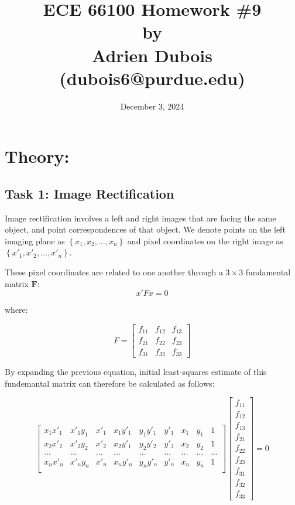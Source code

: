 \documentclass{article}
\author{}
\date{December 3, 2024}
\title{\Large \textbf{ECE 66100 Homework \#9\\[0.1in] by\\ [0.1in] Adrien Dubois (dubois6@purdue.edu)}}
\begin{document}
\maketitle
\tableofcontents

\section{Theory:}
\subsection{Task 1: Image Rectification}
Image rectification involves a left and right images that are facing the same object, and point correspondences 
of that object. We denote points on the left imaging plane as $\left\{x_1, x_2, ..., x_n\right\}$ and pixel
coordinates on the right image as $\left\{x'_1, x'_2, ..., x'_n\right\}$. 

These pixel coordinates are related to one another through a $3\times3$ fundamental matrix $\boldsymbol{F}$:
\[x' F x = 0\]

where:

\[F = 
    \begin{bmatrix}
        f_{11} & f_{12} & f_{13} \\
        f_{21} & f_{22} & f_{23} \\
        f_{31} & f_{32} & f_{33}
    \end{bmatrix}
\]

By expanding the previous equation, initial least-squares estimate of this fundemantal matrix can 
therefore be calculated as follows:

\[
    \begin{bmatrix}
        x_1 x'_1 & x'_1 y_1 & x'_1 & x_1 y'_1 & y_1 y'_1 & y'_1 & x_1 & y_1 & 1 \\
        x_2 x'_2 & x'_2 y_2 & x'_2 & x_2 y'_1 & y_2 y'_2 & y'_2 & x_2 & y_2 & 1 \\
        ...      & ...      & ...  &   ...    &    ...   & ...  & ... & ... & ... \\
        x_n x'_n & x'_n y_n & x'_n & x_n y'_n & y_n y'_n & y'_n & x_n & y_n & 1 \\
    \end{bmatrix}
    \begin{bmatrix}
        f_{11} \\ f_{12} \\ f_{13} \\ f_{21} \\ f_{22} \\ f_{23} \\ f_{31} \\ f_{32} \\ f_{33}
    \end{bmatrix} = 0
\]
\end{document}
